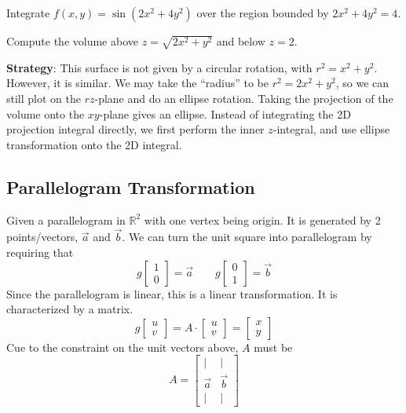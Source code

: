 \begin{exercise}
    Integrate $f(x, y) = \sin(2x^2 + 4y^2)$ over the region bounded by $2x^2 + 4y^2 = 4$.
\end{exercise}

\begin{exercise}
    Compute the volume above $z = \sqrt{2x^2 + y^2}$ and below $z = 2$. 

    \textbf{Strategy}: This surface is not given by a circular rotation, with $r^2 = x^2 + y^2$. However, it is similar. We may take the ``radius'' to be $r^2 = 2x^2 + y^2$, so we can still plot on the $rz$-plane and do an ellipse rotation. Taking the projection of the volume onto the $xy$-plane gives an ellipse. Instead of integrating the 2D projection integral directly, we first perform the inner $z$-integral, and use ellipse transformation onto the 2D integral.
\end{exercise}

\subsection*{Parallelogram Transformation}

Given a parallelogram in $\mathbb{R}^2$ with one vertex being origin. It is generated by 2 points/vectors, $\vec{a}$ and $\vec{b}$. We can turn the unit square into parallelogram by requiring that $$g\begin{bmatrix} 1 \\ 0 \end{bmatrix} = \vec{a} \qquad g\begin{bmatrix} 0 \\ 1 \end{bmatrix} = \vec{b}$$ Since the parallelogram is linear, this is a linear transformation. It is characterized by a matrix. $$g\begin{bmatrix} u \\ v \end{bmatrix} = A \cdot \begin{bmatrix} u \\ v \end{bmatrix} = \begin{bmatrix} x \\ y \end{bmatrix}$$ Cue to the constraint on the unit vectors above, $A$ must be $$A = \begin{bmatrix} | & | \\ \vec{a} & \vec{b} \\ | & | \end{bmatrix}$$

